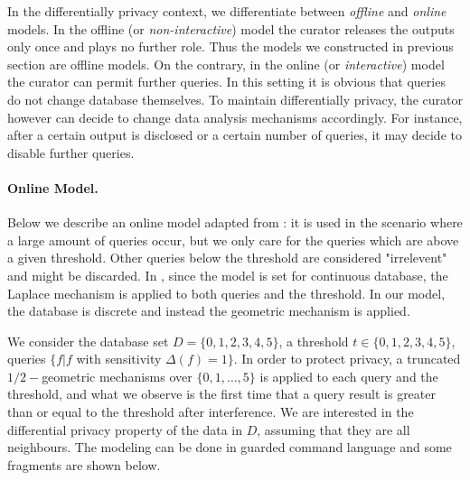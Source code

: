 In the differentially privacy context, we differentiate between \emph{offline} and \emph{online} models.
In the offline (or \emph{non-interactive}) model the curator releases the outputs only once and plays no further role. Thus the models we constructed in previous section are offline models. On the contrary, in the online (or \emph{interactive}) model the curator can permit further queries. In this setting it is obvious that queries do not change database themselves. To maintain differentially privacy, the curator however can decide to change data analysis mechanisms accordingly. For instance, after a certain output is disclosed or a certain number of queries, it may decide to disable further queries.


\paragraph{Online Model.}
Below we describe an online model adapted from \cite{}: it is used in the scenario where a large amount of queries occur, but we only care for the queries which
are above a given threshold. Other queries below the threshold are considered "irrelevent" and might be discarded. In \cite{}, since the model is set for continuous database, the Laplace mechanism is applied to both queries and the threshold. In our model, the database is discrete and instead the geometric mechanism is applied.

We consider the database set $D = \{0,1,2,3,4,5\}$, a threshold $t \in \{0,1,2,3,4,5\}$, queries $\{f| f $ with sensitivity $\Delta (f) = 1 \}$. In order to protect privacy, a truncated $1/2-$geometric mechanisms over $\{ 0, 1, \ldots, 5 \}$ is applied to each query and the threshold, and what we observe is the first time that a query result is greater than or equal to the threshold after interference. We are interested in the differential privacy property of the data in $D$, assuming that they are all neighbours. The modeling can be done in guarded command language and some fragments are shown below.

